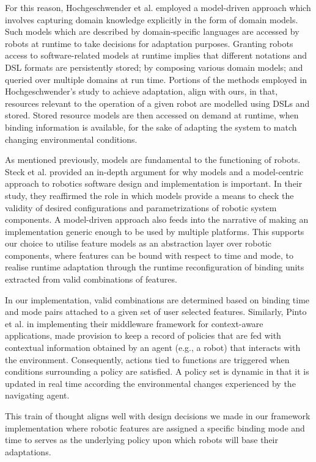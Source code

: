 \documentclass[conference]{IEEEtran}
\begin{document}
For this reason, Hochgeschwender et al. \cite{graph-mde} employed a model-driven approach which involves capturing domain knowledge explicitly in the form of domain models. Such models which are described by domain-specific languages are accessed by robots at runtime to take decisions for adaptation purposes. Granting robots access to software-related models at runtime implies that different notations and DSL formats are persistently stored; by composing various domain models; and queried over multiple domains at run time. Portions of the methods employed in Hochgeschwender's study to achieve adaptation, align with ours, in that, resources relevant to the operation of a given robot are modelled using DSLs and stored. Stored resource models are then accessed on demand at runtime, when binding information is available, for the sake of adapting the system to match changing environmental conditions.

As mentioned previously, models are fundamental to the functioning of robots. Steck et al. \cite{model-centric} provided an in-depth argument for why models and a model-centric approach to robotics software design and implementation is important.
In their study, they reaffirmed the role in which models provide a means to check the validity of desired configurations and parametrizations of robotic system components. A model-driven approach also feeds into the narrative of making an implementation generic enough to be used by multiple platforms. This supports our choice to utilise feature models as an abstraction layer over robotic components, where features can be bound with respect to time and mode, to realise runtime adaptation through the runtime reconfiguration of binding units extracted from valid combinations of features.

 In our implementation, valid combinations are determined based on binding time and mode pairs attached to a given set of user selected features. Similarly, Pinto et al. \cite{cont-aware} in implementing their middleware framework for context-aware applications, made provision to keep a record of policies that are fed with contextual information obtained by an agent (e.g., a robot) that interacts with the environment. Consequently, actions tied to functions are triggered when conditions surrounding a policy are satisfied. A policy set is dynamic in that it is updated in real time according the environmental changes experienced by the navigating agent.
 
 This train of thought aligns well with design decisions we made in our framework implementation where robotic features are assigned a specific binding mode and time to serves as the underlying policy upon which robots will base their adaptations.
 
\end{document}
